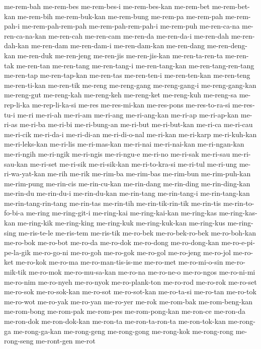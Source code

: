 {me-rem-bah me-rem-bes me-rem-bes-i me-rem-bes-kan me-rem-bet
me-rem-bet-kan me-rem-bih me-rem-buk-kan me-rem-bung me-rem-pa me-rem-pah
me-rem-pah-i me-rem-pah-rem-pah me-rem-pah-rem-pah-i me-rem-puh
me-ren-ca-na me-ren-ca-na-kan me-ren-cah me-ren-cam me-ren-da me-ren-da-i
me-ren-dah me-ren-dah-kan me-ren-dam me-ren-dam-i me-ren-dam-kan
me-ren-dang me-ren-deng-kan me-ren-duk me-ren-jeng me-ren-jis
me-ren-jis-kan me-ren-ta-ren-ta me-ren-tak me-ren-tan me-ren-tang
me-ren-tang-i me-ren-tang-kan me-ren-tang-ren-tang me-ren-tap
me-ren-tap-kan me-ren-tas me-ren-ten-i me-ren-ten-kan me-ren-teng
me-ren-ti-kan me-ren-tik me-reng me-reng-gang me-reng-gang-i
me-reng-gang-kan me-reng-gut me-reng-kah me-reng-keh me-reng-ket
me-reng-kuh me-reng-sa me-rep-li-ka me-rep-li-ka-si me-res me-res-mi-kan
me-res-pons me-res-to-ra-si me-res-tu-i me-ri me-ri-ah me-ri-am me-ri-ang
me-ri-ang-kan me-ri-ap me-ri-ap-kan me-ri-as me-ri-ba me-ri-bi
me-ri-bung-an me-ri-but me-ri-but-kan me-ri-ca me-ri-cau me-ri-cik
me-ri-da-i me-ri-di-an me-ri-di-o-nal me-ri-kan me-ri-karp me-ri-kuh-kan
me-ri-leks-kan me-ri-lis me-ri-mas-kan me-ri-nai me-ri-nai-kan
me-ri-ngan-kan me-ri-ngih me-ri-ngik me-ri-ngis me-ri-ngu-e me-ri-no
me-ri-sak me-ri-sau me-ri-sau-kan me-ri-set me-ri-sik me-ri-sik-kan
me-ri-to-kra-si me-ri-tul me-ri-ung me-ri-wa-yat-kan me-rih me-rik
me-rim-ba me-rim-bas me-rim-bun me-rim-puh-kan me-rim-pung me-rin-cis
me-rin-cu-kan me-rin-dang me-rin-ding me-rin-ding-kan me-rin-du
me-rin-du-i me-rin-du-kan me-rin-tang me-rin-tang-i me-rin-tang-kan
me-rin-tang-rin-tang me-rin-tas me-rin-tih me-rin-tik-rin-tik me-rin-tis
me-rin-to-fo-bi-a me-ring me-ring-git-i me-ring-kai me-ring-kai-kan
me-ring-kas me-ring-kas-kan me-ring-kik me-ring-king me-ring-kuk
me-ring-kuk-kan me-ring-kus me-ring-sing me-ris-te-le me-ris-tem
me-ris-tik me-ro-bek me-ro-bek-ro-bek me-ro-boh-kan me-ro-bok me-ro-bot
me-ro-da me-ro-dok me-ro-dong me-ro-dong-kan me-ro-e-pi-pe-la-gik
me-ro-go-ni me-ro-goh me-ro-gok me-ro-gol me-ro-jeng me-ro-jol me-ro-ket
me-ro-kok me-ro-ma me-ro-man-tis-is-me me-ro-met me-ro-mi-o-sin
me-ro-mik-tik me-ro-mok me-ro-mu-sa-kan me-ro-na me-ro-ne-o me-ro-ngos
me-ro-ni-mi me-ro-nim me-ro-nyeh me-ro-nyok me-ro-plank-ton me-ro-rod
me-ro-rok me-ro-set me-ro-sok me-ro-sok-kan me-ro-sot me-ro-sot-kan
me-ro-ta-si me-ro-tan me-ro-tok me-ro-wot me-ro-yak me-ro-yan me-ro-yer
me-rok me-rom-bak me-rom-beng-kan me-rom-bong me-rom-pak me-rom-pes
me-rom-pong-kan me-ron-ce me-ron-da me-ron-dok me-ron-dok-kan me-ron-ta
me-ron-ta-ron-ta me-ron-tok-kan me-rong-ga me-rong-ga-kan me-rong-geng
me-rong-gong me-rong-kok me-rong-rong me-rong-seng me-ront-gen me-rot
}
